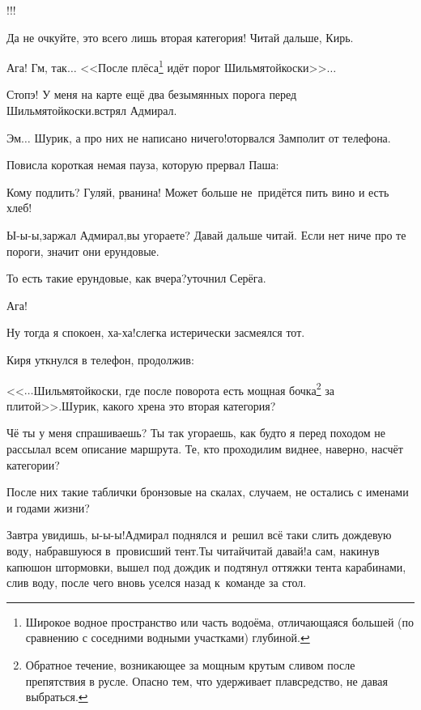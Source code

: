 \diagdash !!!

\diagdash Да не очкуйте, это всего лишь вторая категория! Читай дальше, Кирь.

\renewcommand*{\thefootnote}{\fnsymbol{footnote}}
\setcounter{footnote}{0}
\diagdash Ага! Гм, так$\ldots$ <<После плёса\footnote{Широкое водное пространство или часть водоёма, отличающаяся большей (по сравнению с соседними водными участками) глубиной.} идёт порог Шильмятойкоски>>$\ldots$

\diagdash Стопэ! У меня на карте ещё два безымянных порога перед Шильмятойкоски.\mdash встрял Адмирал.

\diagdash Эм$\ldots$ Шурик, а про них не написано ничего!\mdash оторвался Замполит от телефона.

Повисла короткая немая пауза, которую прервал Паша:

\diagdash Кому подлить? Гуляй, рванина! Может больше не~придётся пить вино и есть хлеб!

\diagdash Ы-ы-ы,\mdash заржал Адмирал,\mdash вы угораете? Давай дальше читай. Если нет ниче про те пороги, значит они ерундовые.

\diagdash То есть такие ерундовые, как вчера?\mdash уточнил Серёга.

\diagdash Ага!

\diagdash Ну тогда я спокоен, ха-ха!\mdash слегка истерически засмеялся тот.

Киря уткнулся в телефон, продолжив:

\renewcommand*{\thefootnote}{\fnsymbol{footnote}}
\setcounter{footnote}{0}
\diagdash <<$\ldots$Шильмятойкоски, где после поворота есть мощная бочка\footnote{Обратное течение, возникающее за мощным крутым сливом после препятствия в русле. Опасно тем, что удерживает плавсредство, не давая выбраться.} за плитой>>.\mdash Шурик, какого хрена это вторая категория?

\diagdash Чё ты у меня спрашиваешь? Ты так угораешь, как будто я перед походом не рассылал всем описание маршрута. Те, кто проходил\mdash им виднее, наверно, насчёт категории? 

\diagdash После них такие таблички бронзовые на скалах, случаем, не остались с именами и годами жизни?

\diagdash Завтра увидишь, ы-ы-ы!\mdash Адмирал поднялся и~решил всё таки слить дождевую воду, набравшуюся в~провисший тент.\mdash Ты читай\sdash читай давай!\mdash а сам, накинув капюшон штормовки, вышел под дождик и подтянул оттяжки тента карабинами, слив воду, после чего вновь уселся назад к~команде за стол.


